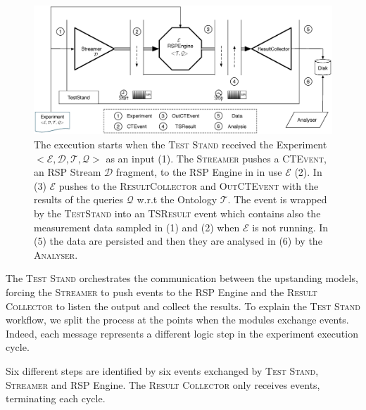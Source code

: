 \begin{figure}[t!bh]
\centering
\includegraphics[scale=0.37]{images/heaven-schema-workflow}
\caption[\name Modules and Workflow]{The execution starts when the \textsc{Test Stand} received the Experiment $<\mathcal{E},\mathcal{D},\mathcal{T},\mathcal{Q}>$ as an input (1). The \textsc{Streamer} pushes a \textsc{CTEvent}, an RSP Stream $\mathcal{D}$ fragment, to the RSP Engine in in use $\mathcal{E}$ (2). In (3) $\mathcal{E}$ pushes to the \textsc{ResultCollector} and \textsc{OutCTEvent} with the results of the queries $\mathcal{Q}$ w.r.t the Ontology $\mathcal{T}$. The event is wrapped by the \textsc{TestStand} into an \textsc{TSResult} event which contains also the measurement data sampled in (1) and (2) when $\mathcal{E}$ is not running. In (5) the data are persisted and then they are analysed in (6) by the \textsc{Analyser}.}
\label{fig:architecture}
\end{figure}

\noindent The \textsc{Test Stand} orchestrates the communication between the upstanding models, forcing the \textsc{Streamer} to push events to the RSP Engine and the \textsc{Result Collector} to listen the output and collect the results. To explain the \textsc{Test Stand} workflow, we split the process at the points when the modules exchange events. Indeed, each message represents a different logic step in the experiment execution cycle.

Six different steps are identified by six events exchanged by \textsc{Test Stand}, \textsc{Streamer} and RSP Engine. The \textsc{Result Collector} only receives events, terminating each cycle.

